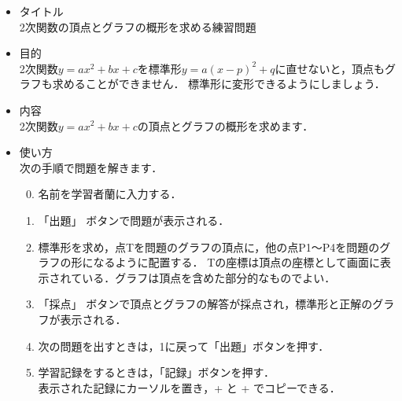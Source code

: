 \documentclass[20]{jarticle}
\begin{document}
\begin{itemize}
\item タイトル\\
2次関数の頂点とグラフの概形を求める練習問題

\item 目的\\
2次関数$y=ax^2+bx+c$を標準形$y=a(x-p)^2+q$に直せないと，頂点もグラフも求めることができません．
標準形に変形できるようにしましょう．

\item 内容\\
2次関数$y=ax^2+bx+c$の頂点とグラフの概形を求めます．

\item 使い方\\
次の手順で問題を解きます．
\begin{enumerate}
\setcounter{enumi}{-1}
\item 名前を学習者蘭に入力する．
\item 「出題」 ボタンで問題が表示される．
\item 標準形を求め，点Tを問題のグラフの頂点に，他の点P1～P4を問題のグラフの形になるように配置する．
Tの座標は頂点の座標として画面に表示されている．グラフは頂点を含めた部分的なものでよい．
\item 「採点」 ボタンで頂点とグラフの解答が採点され，標準形と正解のグラフが表示される．
\item 次の問題を出すときは，1に戻って「出題」ボタンを押す．
\item 学習記録をするときは，「記録」ボタンを押す．\\[1mm]
\hspace{2zw}表示された記録にカーソルを置き，+ と + でコピーできる．


\end{enumerate}

\end{itemize}
\end{document}
